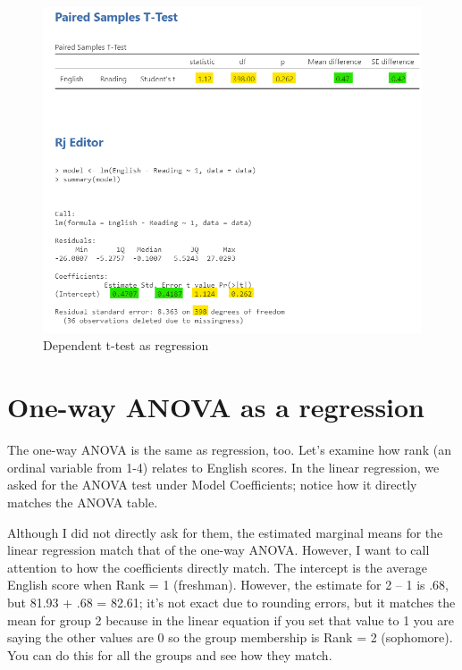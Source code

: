 \documentclass[
]{book}
\begin{document}
\begin{figure}

{\centering \includegraphics[width=1\linewidth]{images/14-regression-wrap-up/dependent_t-test} 

}

\caption{Dependent t-test as regression}\label{fig:unnamed-chunk-3}
\end{figure}

\hypertarget{one-way-anova-as-a-regression}{%
\section{One-way ANOVA as a regression}\label{one-way-anova-as-a-regression}}

The one-way ANOVA is the same as regression, too. Let's examine how rank (an ordinal variable from 1-4) relates to English scores. In the linear regression, we asked for the ANOVA test under Model Coefficients; notice how it directly matches the ANOVA table.

Although I did not directly ask for them, the estimated marginal means for the linear regression match that of the one-way ANOVA. However, I want to call attention to how the coefficients directly match. The intercept is the average English score when Rank = 1 (freshman). However, the estimate for 2 -- 1 is .68, but 81.93 + .68 = 82.61; it's not exact due to rounding errors, but it matches the mean for group 2 because in the linear equation if you set that value to 1 you are saying the other values are 0 so the group membership is Rank = 2 (sophomore). You can do this for all the groups and see how they match.
\end{document}
